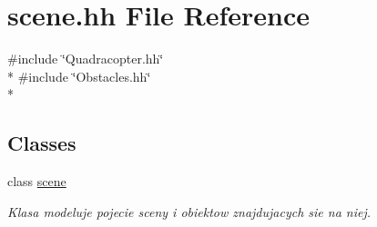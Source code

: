 \hypertarget{scene_8hh}{}\section{scene.\+hh File Reference}
\label{scene_8hh}
{\ttfamily \#include \char`\"{}Quadracopter.\+hh\char`\"{}}\\*
{\ttfamily \#include \char`\"{}Obstacles.\+hh\char`\"{}}\\*
\subsection*{Classes}
\begin{DoxyCompactItemize}
\item 
class \hyperlink{classscene}{scene}
\begin{DoxyCompactList}\small\item\em Klasa modeluje pojecie sceny i obiektow znajdujacych sie na niej. \end{DoxyCompactList}\end{DoxyCompactItemize}
